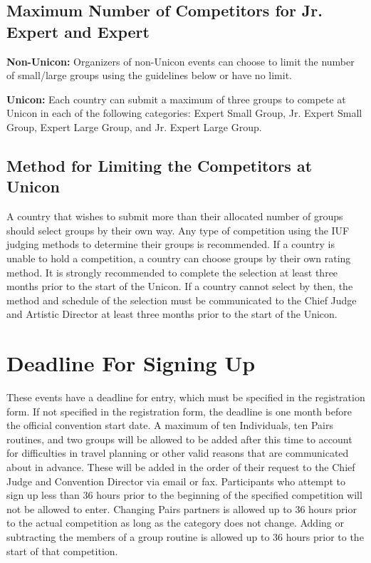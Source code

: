 \subsection{Maximum Number of Competitors for Jr. Expert and Expert}
\textbf{Non-Unicon:} Organizers of non-Unicon events can choose to limit the number of small/large groups using the guidelines below or have no limit.

\textbf{Unicon:} Each country can submit a maximum of three groups to compete at Unicon in each of the following categories: Expert Small Group, Jr. Expert Small Group, Expert Large Group, and Jr. Expert Large Group.

\subsection{Method for Limiting the Competitors at Unicon}
A country that wishes to submit more than their allocated number of groups should select groups by their own way.
Any type of competition using the IUF judging methods to determine their groups is recommended.
If a country is unable to hold a competition, a country can choose groups by their own rating method.
It is strongly recommended to complete the selection at least three months prior to the start of the Unicon.
If a country cannot select by then, the method and schedule of the selection must be communicated to the Chief Judge and Artistic Director at least three months prior to the start of the Unicon.

\section{Deadline For Signing Up}
These events have a deadline for entry, which must be specified in the registration form.
If not specified in the registration form, the deadline is one month before the official convention start date.
A maximum of ten Individuals, ten Pairs routines, and two groups will be allowed to be added after this time to account for difficulties in travel planning or other valid reasons that are communicated about in advance.
These will be added in the order of their request to the Chief Judge and Convention Director via email or fax.
Participants who attempt to sign up less than 36 hours prior to the beginning of the specified competition will not be allowed to enter.
Changing Pairs partners is allowed up to 36 hours prior to the actual competition as long as the category does not change.
Adding or subtracting the members of a group routine is allowed up to 36 hours prior to the start of that competition.

